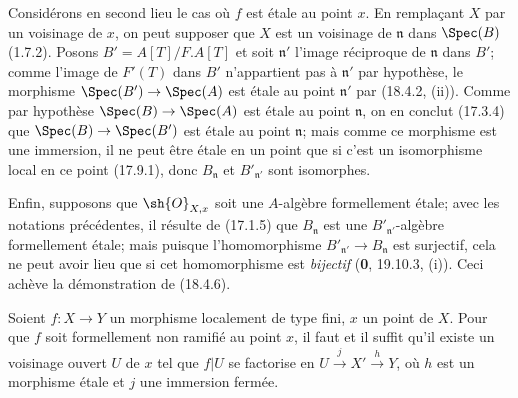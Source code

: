 Considérons en second lieu le cas où $f$ est étale au point $x$. En remplaçant $X$ par un voisinage de $x$, on peut supposer que $X$ est un voisinage de $\mathfrak n$ dans $\Spec(B)$ (1.7.2). Posons $B'=A[T]/F.A[T]$ et soit $\mathfrak n'$ l'image réciproque de $\mathfrak n$ dans $B'$; comme l'image de $F'(T)$ dans $B'$ n'appartient pas à $\mathfrak n'$ par hypothèse, le morphisme $\Spec(B')\to\Spec(A)$ est étale au point $\mathfrak n'$ par (18.4.2, (ii)). Comme par hypothèse $\Spec(B)\to\Spec(A)$ est étale au point $\mathfrak n$, on en conclut (17.3.4) que $\Spec(B)\to\Spec(B')$ est étale au point $\mathfrak n$; mais comme ce morphisme est une immersion, il ne peut être étale en un point que si c'est un isomorphisme local en ce point (17.9.1), donc $B_{\mathfrak n}$ et $B'_{\mathfrak n'}$ sont isomorphes.

Enfin, supposons que $\sh{O}_{X,x}$ soit une $A$-algèbre formellement étale; avec les notations précédentes, il résulte de (17.1.5) que $B_{\mathfrak n}$ est une $B'_{\mathfrak n'}$-algèbre formellement étale; mais puisque l'homomorphisme $B'_{\mathfrak n'}\to B_{\mathfrak n}$ est surjectif, cela ne peut avoir lieu que si cet homomorphisme est \emph{bijectif} (\textbf{0}, 19.10.3, (i)). Ceci achève la démonstration de (18.4.6).

\begin{corollary}[18.4.7]
\label{IV.18.4.7}
Soient $f:X\to Y$ un morphisme localement de type fini, $x$ un point de $X$. Pour que $f$ soit formellement non ramifié au point $x$, il faut et il suffit qu'il existe un voisinage ouvert $U$ de $x$ tel que $f|U$ se factorise en $U\xrightarrow{j}X'\xrightarrow{h}Y$, où $h$ est un morphisme étale et $j$ une immersion fermée.
\end{corollary}

